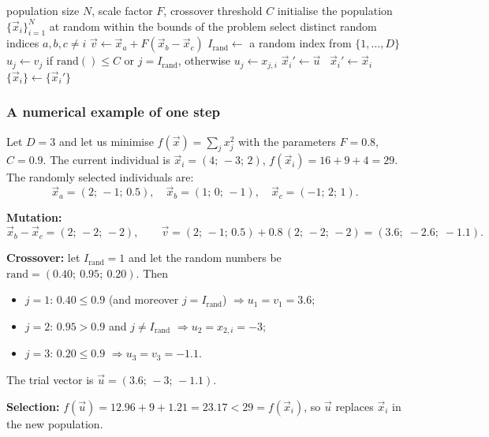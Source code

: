 \documentclass[11pt,a4paper]{article}
\theoremstyle{definition}
\begin{document}
\begin{algorithm}[!ht]
\caption{DE/rand/1/bin}
\begin{algorithmic}[1]
\Require population size $N$, scale factor $F$, crossover threshold $C$
\State initialise the population $\{\vec x_i\}_{i=1}^{N}$ at random within the bounds of the problem
    \State select distinct random indices $a,b,c \ne i$
    \State $\vec v \gets \vec x_a + F(\vec x_b - \vec x_c)$
    \State $I_{\mathrm{rand}} \gets$ a random index from $\{1,\dots,D\}$
      \State $u_j \gets v_j$ if $\mathrm{rand}() \le C$ or $j = I_{\mathrm{rand}}$, otherwise $u_j \gets x_{j,i}$
    \EndFor
     $\vec x_i' \gets \vec u$ \Else\ $\vec x_i' \gets \vec x_i$ \EndIf
  \EndFor
  \State $\{\vec x_i\} \gets \{\vec x_i'\}$
\EndWhile
\end{algorithmic}
\end{algorithm}

\subsubsection{A numerical example of one step}

Let $D = 3$ and let us minimise $f(\vec x) = \sum_j x_j^2$ with the parameters
$F = 0.8$, $C = 0.9$. The current individual is
$\vec x_i = (4;\, -3;\, 2)$, $f(\vec x_i) = 16+9+4 = 29$.
The randomly selected individuals are:
\[
\vec x_a = (2;\, -1;\, 0.5), \quad
\vec x_b = (1;\, 0;\, -1), \quad
\vec x_c = (-1;\, 2;\, 1).
\]

\textbf{Mutation:}
\[
\vec x_b - \vec x_c = (2;\, -2;\, -2), \qquad
\vec v = (2;\,-1;\,0.5) + 0.8\,(2;\,-2;\,-2) = (3.6;\; -2.6;\; -1.1).
\]

\textbf{Crossover:} let $I_{\mathrm{rand}} = 1$ and let the random numbers be
$\mathrm{rand} = (0.40;\ 0.95;\ 0.20)$. Then
\begin{itemize}
\item $j=1$: $0.40 \le 0.9$ (and moreover $j = I_{\mathrm{rand}}$) $\Rightarrow u_1 = v_1 = 3.6$;
\item $j=2$: $0.95 > 0.9$ and $j \ne I_{\mathrm{rand}}$ $\Rightarrow u_2 = x_{2,i} = -3$;
\item $j=3$: $0.20 \le 0.9$ $\Rightarrow u_3 = v_3 = -1.1$.
\end{itemize}
The trial vector is $\vec u = (3.6;\, -3;\, -1.1)$.

\textbf{Selection:} $f(\vec u) = 12.96 + 9 + 1.21 = 23.17 < 29 = f(\vec x_i)$,
so $\vec u$ replaces $\vec x_i$ in the new population.
\end{document}
